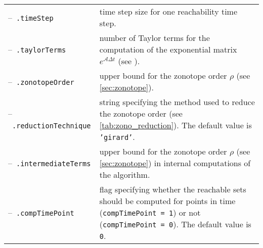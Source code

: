 \begin{center}
\renewcommand{\arraystretch}{1.3}
\begin{tabular}[t]{l p{11cm}}	
	--~\texttt{.timeStep} & time step size for one reachability time step. \\
	--~\texttt{.taylorTerms} & number of Taylor terms for the computation of the exponential matrix $e^{\mathcal{A}\Delta t}$ (see \cite[Theorem 3.2]{Althoff2010a}). \\
	--~\texttt{.zonotopeOrder} & upper bound for the zonotope order $\rho$ (see \cref{sec:zonotope}).\\
	--~\texttt{.reductionTechnique} & string specifying the method used to reduce the zonotope order (see \cref{tab:zono_reduction}). The default value is \texttt{'girard'}. \\
	--~\texttt{.intermediateTerms} & upper bound for the zonotope order $\rho$ (see \cref{sec:zonotope}) in internal computations of the algorithm. \\
	--~\texttt{.compTimePoint} & flag specifying whether the reachable sets should be computed for points in time  (\texttt{compTimePoint = 1}) or not (\texttt{compTimePoint = 0}). The default value is \texttt{0}.
\end{tabular}
\end{center}
